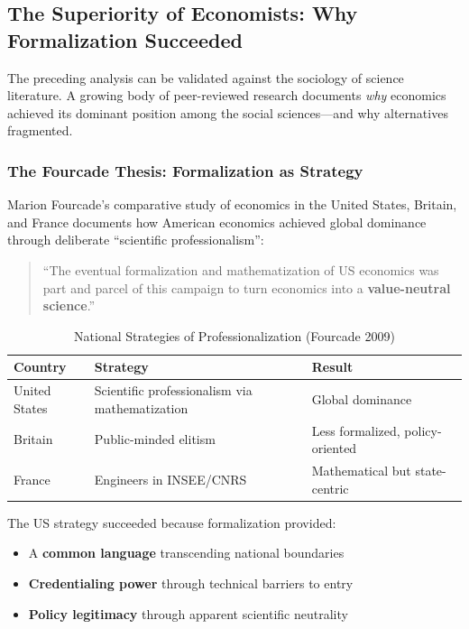 
\subsection{The Superiority of Economists: Why Formalization Succeeded}
\label{sec:meta-superiority}

The preceding analysis can be validated against the sociology of science literature.
A growing body of peer-reviewed research documents \textit{why} economics achieved
its dominant position among the social sciences---and why alternatives fragmented.

\subsubsection{The Fourcade Thesis: Formalization as Strategy}

Marion Fourcade's comparative study of economics in the United States, Britain,
and France \citep{fourcade2009economists} documents how American economics achieved global
dominance through deliberate ``scientific professionalism'':

\begin{quote}
``The eventual formalization and mathematization of US economics was part and
parcel of this campaign to turn economics into a \textbf{value-neutral science}.''
\end{quote}

\begin{table}[htbp]
\centering
\caption{National Strategies of Professionalization (Fourcade 2009)}
\label{tab:fourcade-national}
\renewcommand{\arraystretch}{1.3}
\small
\begin{tabular}{@{}lll@{}}
\toprule
\textbf{Country} & \textbf{Strategy} & \textbf{Result} \\
\midrule
United States & Scientific professionalism via mathematization & Global dominance \\
Britain & Public-minded elitism & Less formalized, policy-oriented \\
France & Engineers in INSEE/CNRS & Mathematical but state-centric \\
\bottomrule
\end{tabular}
\end{table}

The US strategy succeeded because formalization provided:
\begin{itemize}[nosep]
    \item A \textbf{common language} transcending national boundaries
    \item \textbf{Credentialing power} through technical barriers to entry
    \item \textbf{Policy legitimacy} through apparent scientific neutrality
\end{itemize}

